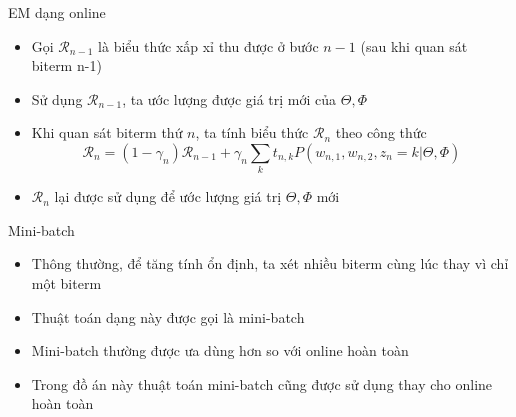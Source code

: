 \documentclass[pdf]{beamer}
\begin{document}
\begin{frame}{EM dạng online}
	\begin{itemize}
		\item Gọi $\mathcal{R}_{n-1}$ là biểu thức xấp xỉ thu được ở bước $n-1$ (sau khi quan sát biterm n-1)
		\item Sử dụng $\mathcal{R}_{n-1}$, ta ước lượng được giá trị mới của $\Theta, \Phi$
		\item Khi quan sát biterm thứ $n$, ta tính biểu thức $\mathcal{R}_{n}$ theo công thức
			\begin{equation}
				\mathcal{R}_{n} = (1 - \gamma_{n}) \mathcal{R}_{n-1} + \gamma_{n} \sum_k t_{n,k} P(w_{n,1}, w_{n,2}, z_{n}=k | \Theta, \Phi)
			\end{equation}
		\item $\mathcal{R}_{n}$ lại được sử dụng để ước lượng giá trị $\Theta, \Phi$ mới
	\end{itemize}
\end{frame}


\begin{frame}{Mini-batch}
	\begin{itemize}
		\item Thông thường, để tăng tính ổn định, ta xét nhiều biterm cùng lúc thay vì chỉ một biterm
		\item Thuật toán dạng này được gọi là mini-batch
		\item Mini-batch thường được ưa dùng hơn so với online hoàn toàn
		\item Trong đồ án này thuật toán mini-batch cũng được sử dụng thay cho online hoàn toàn
	\end{itemize}
\end{frame}
\end{document}
